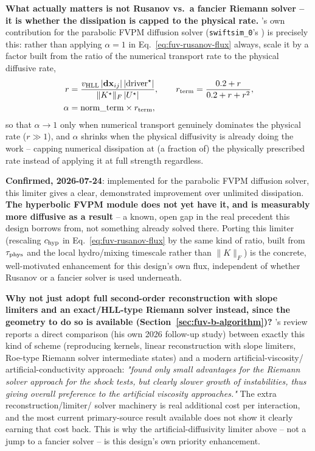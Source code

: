\textbf{What actually matters is not Rusanov vs.\ a fancier Riemann
solver -- it is whether the dissipation is capped to the physical rate.}
\citet{Hopkins2017diffusion}'s own contribution for the parabolic FVPM
diffusion solver (\texttt{swiftsim\_0}'s
) is precisely this: rather
than applying $\alpha=1$ in Eq.~\ref{eq:fuv-rusanov-flux} always, scale
it by a factor built from the ratio of the numerical transport rate to
the physical diffusive rate,
\begin{align}
  r &= \frac{v_{\rm HLL}\,|\mathbf{dx}_{ij}|\,|{\rm driver}^\star|}
            {\|K^\star\|_F\,|U^\star|} , \qquad
  r_{\rm term} = \frac{0.2+r}{0.2+r+r^2} ,
  \label{eq:fuv-alpha-limiter-r} \\
  \alpha &= {\rm norm\_term}\times r_{\rm term} ,
  \label{eq:fuv-alpha-limiter}
\end{align}
so that $\alpha\to1$ only when numerical transport genuinely dominates
the physical rate ($r\gg1$), and $\alpha$ shrinks when the physical
diffusivity is already doing the work -- capping numerical dissipation
at (a fraction of) the physically prescribed rate instead of applying
it at full strength regardless.

\textbf{Confirmed, 2026-07-24}: implemented for the parabolic FVPM
diffusion solver, this limiter gives a clear, demonstrated improvement
over unlimited dissipation. \textbf{The hyperbolic FVPM module does not
yet have it, and is measurably more diffusive as a result} -- a known,
open gap in the real precedent this design borrows from, not something
already solved there. Porting this limiter (rescaling $c_{\rm hyp}$ in
Eq.~\ref{eq:fuv-rusanov-flux} by the same kind of ratio, built from
$\tau_{\rm phys}$ and the local hydro/mixing timescale rather than
$\|K\|_F$) is the concrete, well-motivated enhancement for this design's
own flux, independent of whether Rusanov or a fancier solver is used
underneath.

\textbf{Why not just adopt full second-order reconstruction with slope
limiters and an exact/HLL-type Riemann solver instead, since the
geometry to do so is available (Section~\ref{sec:fuv-b-algorithm})?}
\citet{Rosswog2026}'s review reports a direct comparison (his own 2026
follow-up study) between exactly this kind of scheme (reproducing
kernels, linear reconstruction with slope limiters, Roe-type Riemann
solver intermediate states) and a modern artificial-viscosity/
artificial-conductivity approach: \emph{"found only small advantages
for the Riemann solver approach for the shock tests, but clearly slower
growth of instabilities, thus giving overall preference to the
artificial viscosity approaches."} The extra reconstruction/limiter/
solver machinery is real additional cost per interaction, and the most
current primary-source result available does not show it clearly
earning that cost back. This is why the artificial-diffusivity limiter
above -- not a jump to a fancier solver -- is this design's own
priority enhancement.

